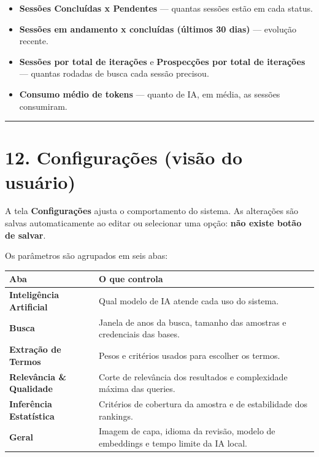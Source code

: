\documentclass[
  brazilian,
  a4paper,12pt,oneside]{report}
\newcounter{none} %
\providecommand{\tightlist}{%
  \setlength{\itemsep}{0pt}\setlength{\parskip}{0pt}}
\begin{document}
\begin{itemize}
\tightlist
\item
  \textbf{Sessões Concluídas x Pendentes} --- quantas sessões estão em
  cada status.
\item
  \textbf{Sessões em andamento x concluídas (últimos 30 dias)} ---
  evolução recente.
\item
  \textbf{Sessões por total de iterações} e \textbf{Prospecções por
  total de iterações} --- quantas rodadas de busca cada sessão precisou.
\item
  \textbf{Consumo médio de tokens} --- quanto de IA, em média, as
  sessões consumiram.
\end{itemize}

\begin{center}\rule{0.5\linewidth}{0.5pt}\end{center}

\chapter{12. Configurações (visão do
usuário)}\label{configurauxe7uxf5es-visuxe3o-do-usuuxe1rio}

A tela \textbf{Configurações} ajusta o comportamento do sistema. As
alterações são salvas automaticamente ao editar ou selecionar uma opção:
\textbf{não existe botão de salvar}.

Os parâmetros são agrupados em seis abas:

{\def\LTcaptype{none} %
\begin{longtable}[]{@{}
  >{\raggedright\arraybackslash}p{}
  >{\raggedright\arraybackslash}p{}@{}}
\toprule\noalign{}
\begin{minipage}[b]{\linewidth}\raggedright
Aba
\end{minipage} & \begin{minipage}[b]{\linewidth}\raggedright
O que controla
\end{minipage} \\
\midrule\noalign{}
\endhead
\bottomrule\noalign{}
\endlastfoot
\textbf{Inteligência Artificial} & Qual modelo de IA atende cada uso do
sistema. \\
\textbf{Busca} & Janela de anos da busca, tamanho das amostras e
credenciais das bases. \\
\textbf{Extração de Termos} & Pesos e critérios usados para escolher os
termos. \\
\textbf{Relevância \& Qualidade} & Corte de relevância dos resultados e
complexidade máxima das queries. \\
\textbf{Inferência Estatística} & Critérios de cobertura da amostra e de
estabilidade dos rankings. \\
\textbf{Geral} & Imagem de capa, idioma da revisão, modelo de embeddings
e tempo limite da IA local. \\
\end{longtable}
}
\end{document}
